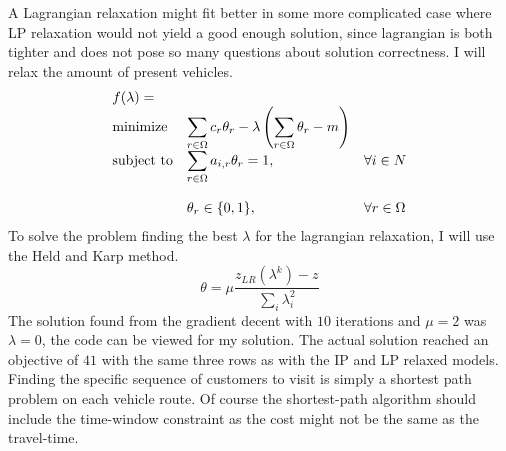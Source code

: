 \documentclass{article}
\begin{document}
    A Lagrangian relaxation might fit better in some more complicated case where LP relaxation would not yield a good enough solution, since lagrangian is both tighter and does not pose so many questions about solution correctness.
    I will relax the amount of present vehicles.
    \begin{equation*}
        \begin{array}{ll@{}ll}
            f(\lambda) =& \\
            \text{minimize}  & \displaystyle\sum_{r \in \Omega} c_r \theta_r - \lambda \left( \sum_{r \in \Omega} \theta_r - m \right)& &\\
            \text{subject to}& \displaystyle\sum_{r \in \Omega} a_{i, r} \theta_r = 1 ,&   &\forall i \in N\\\\
            & \displaystyle \theta_r  \in \{0,1\},  && \forall r \in \Omega
        \end{array}
    \end{equation*}
    To solve the problem finding the best $\lambda$ for the lagrangian relaxation, I will use the Held and Karp method.
    \[
        \theta = \mu \frac{z_{LR}(\lambda^k) - z}{\sum_i \lambda^2_i}
    \]
    The solution found from the gradient decent with $10$ iterations and $\mu=2$ was $\lambda = 0$, the code can be viewed for my solution.
    The actual solution reached an objective of $41$ with the same three rows as with the IP and LP relaxed models.
    Finding the specific sequence of customers to visit is simply a shortest path problem on each vehicle route.
    Of course the shortest-path algorithm should include the time-window constraint as the cost might not be the same as the travel-time.
    \clearpage
\end{document}
